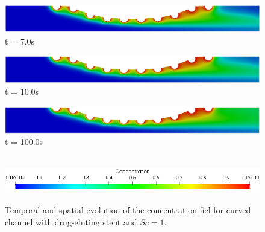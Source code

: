 \begin{figure}[H]
     \begin{minipage}{.50\linewidth}
      \centering
      \includegraphics[scale=0.18]{./02_chaps/cap_solution/figure/conc1_CurvedStrut6.png}\\
      t = 7.0s
     \end{minipage}
     \begin{minipage}{.50\linewidth}
     \medskip
      \centering
      \includegraphics[scale=0.18]{./02_chaps/cap_solution/figure/conc1_CurvedStrut7.png}\\
      t = 10.0s
     \end{minipage}%
     \begin{minipage}{.50\linewidth}
     \medskip
      \centering
      \includegraphics[scale=0.18]{./02_chaps/cap_solution/figure/conc1_CurvedStrut8.png}\\
      t = 100.0s
     \end{minipage}\\[10pt]
      \centering
      \includegraphics[scale=0.5]{./02_chaps/cap_solution/figure/conc1_CurvedStrutScale.png}\\
     \medskip
     \caption{
Temporal and spatial evolution of the concentration fiel for curved channel with drug-eluting stent and $Sc=1$.}
     \label{conc field curved stent sc 1}
\end{figure}



